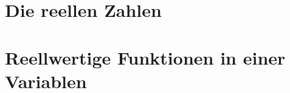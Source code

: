 \documentclass[a4paper,leqno]{article}
\begin{document}


\vspace{2\baselineskip}



\pagebreak



\vspace{2\baselineskip}



\pagebreak

\section{Die reellen Zahlen}

\vspace{1\baselineskip}



\vspace{2\baselineskip}



\pagebreak



\vspace{2\baselineskip}



\vspace{2\baselineskip}



\pagebreak



\pagebreak

\section{Reellwertige Funktionen in einer Variablen}

\vspace{1\baselineskip}


\end{document}
